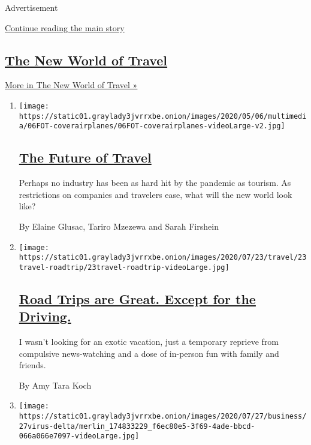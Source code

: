 Advertisement

\protect\hyperlink{after-mid1}{Continue reading the main story}

\hypertarget{the-new-world-of-travel}{%
\subsection{\texorpdfstring{\href{/spotlight/the-new-world-of-travel}{The
New World of
Travel}}{The New World of Travel}}\label{the-new-world-of-travel}}

\href{/spotlight/the-new-world-of-travel}{More in The New World of
Travel »}

\begin{enumerate}
\def\labelenumi{\arabic{enumi}.}
\item
  \texttt{[image: https://static01.graylady3jvrrxbe.onion/images/2020/05/06/multimedia/06FOT-coverairplanes/06FOT-coverairplanes-videoLarge-v2.jpg]}

  \hypertarget{the-future-of-travel}{%
  \subsection{\texorpdfstring{\href{/interactive/2020/05/06/travel/coronavirus-travel-questions.html}{The
  Future of Travel}}{The Future of Travel}}\label{the-future-of-travel}}

  Perhaps no industry has been as hard hit by the pandemic as tourism.
  As restrictions on companies and travelers ease, what will the new
  world look like?

  By Elaine Glusac, Tariro Mzezewa and Sarah Firshein
\item
  \texttt{[image: https://static01.graylady3jvrrxbe.onion/images/2020/07/23/travel/23travel-roadtrip/23travel-roadtrip-videoLarge.jpg]}

  \hypertarget{road-trips-are-great-except-for-the-driving}{%
  \subsection{\texorpdfstring{\href{/2020/07/24/travel/virus-road-trip.html}{Road
  Trips are Great. Except for the
  Driving.}}{Road Trips are Great. Except for the Driving.}}\label{road-trips-are-great-except-for-the-driving}}

  I wasn't looking for an exotic vacation, just a temporary reprieve
  from compulsive news-watching and a dose of in-person fun with family
  and friends.

  By Amy Tara Koch
\item
  \texttt{[image: https://static01.graylady3jvrrxbe.onion/images/2020/07/27/business/27virus-delta/merlin\_174833229\_f6ec80e5-3f69-4ade-bbcd-066a066e7097-videoLarge.jpg]}


\end{enumerate}
